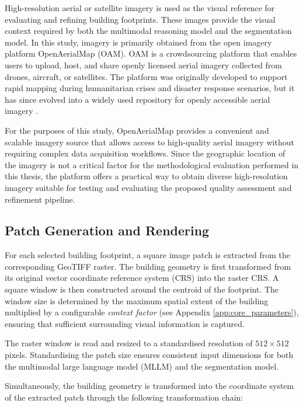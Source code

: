 High-resolution aerial or satellite imagery is used as the visual reference for evaluating and refining building footprints. These images provide the visual context required by both the multimodal reasoning model and the segmentation model. In this study, imagery is primarily obtained from the open imagery platform OpenAerialMap (OAM). OAM is a crowdsourcing platform that enables users to upload, host, and share openly licensed aerial imagery collected from drones, aircraft, or satellites. The platform was originally developed to support rapid mapping during humanitarian crises and disaster response scenarios, but it has since evolved into a widely used repository for openly accessible aerial imagery \citep{openaerialmap, MandourahHochmair2024}.

For the purposes of this study, OpenAerialMap provides a convenient and scalable imagery source that allows access to high-quality aerial imagery without requiring complex data acquisition workflows. Since the geographic location of the imagery is not a critical factor for the methodological evaluation performed in this thesis, the platform offers a practical way to obtain diverse high-resolution imagery suitable for testing and evaluating the proposed quality assessment and refinement pipeline.

\subsection{Patch Generation and Rendering}

For each selected building footprint, a square image patch is extracted from the corresponding GeoTIFF raster. The building geometry is first transformed from its original vector coordinate reference system (CRS) into the raster CRS. A square window is then constructed around the centroid of the footprint. The window size is determined by the maximum spatial extent of the building multiplied by a configurable \emph{context factor} (see Appendix \ref{app:core_parameters}), ensuring that sufficient surrounding visual information is captured.

The raster window is read and resized to a standardised resolution of $512 \times 512$ pixels. Standardising the patch size ensures consistent input dimensions for both the multimodal large language model (MLLM) and the segmentation model.

Simultaneously, the building geometry is transformed into the coordinate system of the extracted patch through the following transformation chain:

